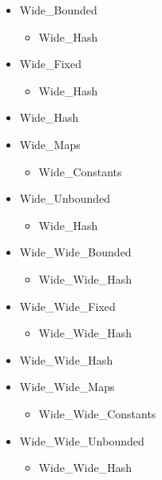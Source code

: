 \documentclass[english]{article}
\begin{document}
\begin{scriptsize}
\begin{multicols*}{5}
\begin{itemize}[leftmargin=0mm]
\begin{itemize}[leftmargin=5mm]
\begin{itemize}[leftmargin=5mm]
\begin{itemize}[leftmargin=5mm]
               \end{itemize}
            \item[] Wide\_Bounded
               \begin{itemize}[leftmargin=5mm]
                  \item[] Wide\_Hash
               \end{itemize}
            \item[] Wide\_Fixed
               \begin{itemize}[leftmargin=5mm]
                  \item[] Wide\_Hash
               \end{itemize}
            \item[] Wide\_Hash
            \item[] Wide\_Maps
               \begin{itemize}[leftmargin=5mm]
                  \item[] Wide\_Constants
               \end{itemize}
            \item[] Wide\_Unbounded
               \begin{itemize}[leftmargin=5mm]
                  \item[] Wide\_Hash
               \end{itemize}
            \item[] Wide\_Wide\_Bounded
               \begin{itemize}[leftmargin=5mm]
                  \item[] Wide\_Wide\_Hash
               \end{itemize}
            \item[] Wide\_Wide\_Fixed
               \begin{itemize}[leftmargin=5mm]
                  \item[] Wide\_Wide\_Hash
               \end{itemize}
            \item[] Wide\_Wide\_Hash
            \item[] Wide\_Wide\_Maps
               \begin{itemize}[leftmargin=5mm]
                  \item[] Wide\_Wide\_Constants
               \end{itemize}
            \item[] Wide\_Wide\_Unbounded
               \begin{itemize}[leftmargin=5mm]
                  \item[] Wide\_Wide\_Hash

\end{itemize}
\end{itemize}
\end{itemize}
\end{itemize}
\end{multicols*}
\end{scriptsize}
\end{document}

